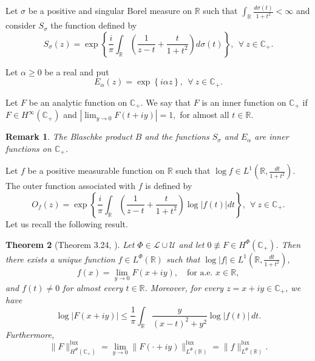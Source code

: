 \documentclass[a4paper,12pt,intlimits,oneside]{amsart}
\newtheorem{theorem}{Theorem}[section]
\newtheorem{remark}[theorem]{Remark}
\theoremstyle{definition}
\numberwithin{equation}{section}
\theoremstyle{definition}
\begin{document}
\medskip

Let $\sigma$ be a positive and singular Borel measure on $\mathbb{R}$ such that
$  \int_{\mathbb{R}}\frac{d\sigma(t)}{1+t^{2}}< \infty$
 and consider $S_{\sigma}$ the function defined by
$$ S_{\sigma}(z)=\exp\left\{ \frac{i}{\pi}\int_{\mathbb{R}}\left(\frac{1}{z-t}+\frac{t}{1+t^{2}}\right)d\sigma(t)  \right\}, ~~\forall~z \in \mathbb{C}_{+}.
   $$


Let $\alpha \geq 0$ be a real and put
$$  E_{\alpha}(z)=\exp\left\{i\alpha z  \right\}, ~~\forall~z \in \mathbb{C}_{+}.
  $$

Let $F$ be an analytic function on $\mathbb{C_{+}}$. We say that $F$ is an inner function on $\mathbb{C_{+}}$ if $F\in H^{\infty}(\mathbb{C_{+}})$
and  $ \left|\lim_{y\to 0}F(t+iy)\right|=1,$
for almost all $t\in \mathbb{R}$.


\begin{remark}\label{pro:maiaqq5}
The Blaschke product $B$ and the functions  $S_{\sigma}$ and $E_{\alpha}$ are inner functions on $\mathbb{C_{+}}$.
\end{remark}

Let $f$ be a positive measurable function on   $\mathbb{R}$ such that  $\log f \in L^{1}\left(\mathbb{R}, \frac{dt}{1+t^{2}}\right)$. The outer function associated with $f$ is  defined by
$$  O_{f}(z)= \exp\left\{ \frac{i}{\pi}\int_{\mathbb{R}}\left(\frac{1}{z-t}+\frac{t}{1+t^{2}}\right)\log|f(t)|dt  \right\}  , ~~\forall~z \in \mathbb{C}_{+}. 
  $$
Let us recall the following result.
\begin{theorem}[Theorem 3.24, \cite{djesehb1}]\label{pro:mainfaaqaqaqq5}
Let $\Phi \in \mathscr{L} \cup \mathscr{U}$ and let $0 \not\equiv F \in H^{\Phi}(\mathbb{C}_{+})$. Then there exists a unique function 
$f \in L^{\Phi}(\mathbb{R})$ such that $\log |f| \in L^{1}\!\left(\mathbb{R}, \frac{dt}{1+t^{2}}\right)$,
\[
f(x)=\lim_{y\to 0}F(x+iy), \quad \text{for a.e. } x \in \mathbb{R},
\]
and $f(t)\neq 0$ for almost every $t \in \mathbb{R}$. Moreover, for every $z=x+iy \in \mathbb{C}_{+}$, we have
\[
\log|F(x+iy)| \leq \frac{1}{\pi}\int_{\mathbb{R}}\frac{y}{(x-t)^{2}+y^{2}}\log|f(t)|\,dt.
\]
Furthermore,
\[
\|F\|_{H^{\Phi}(\mathbb{C}_{+})}^{\mathrm{lux}}
= \lim_{y\to 0}\|F(\cdot+iy)\|_{L^{\Phi}(\mathbb{R})}^{\mathrm{lux}}
= \|f\|_{L^{\Phi}(\mathbb{R})}^{\mathrm{lux}}.
\]
\end{theorem}

\medskip
\end{document}
